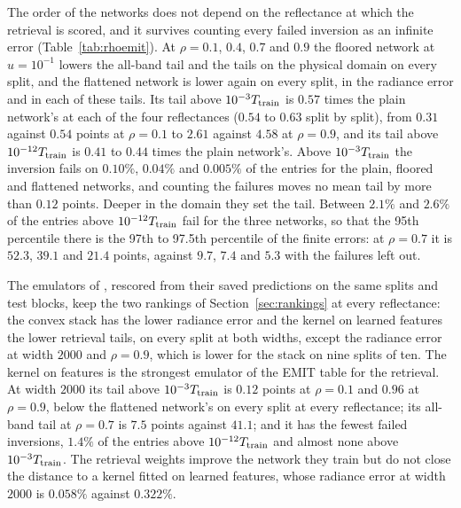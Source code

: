 \documentclass[11pt]{article}
\theoremstyle{remark}
\newcommand{\1}{\mathbf{1}}
\begin{document}
The order of the networks does not depend on the reflectance at which the retrieval is scored, and it survives
counting every failed inversion as an infinite error (Table~\ref{tab:rhoemit}). At $\rho=0.1$, $0.4$, $0.7$ and $0.9$
the floored network at $u=10^{-1}$ lowers the all-band tail and the tails on the physical domain on every split, and
the flattened network is lower again on every split, in the radiance error and in each of these tails. Its tail above
$10^{-3}T_{\rm train}$ is $0.57$ times the plain network's at each of the four reflectances ($0.54$ to $0.63$ split by
split), from $0.31$ against $0.54$ points at $\rho=0.1$ to $2.61$ against $4.58$ at $\rho=0.9$, and its tail above
$10^{-12}T_{\rm train}$ is $0.41$ to $0.44$ times the plain network's. Above $10^{-3}T_{\rm train}$ the inversion fails
on $0.10\%$, $0.04\%$ and $0.005\%$ of the entries for the plain, floored and flattened networks, and counting the
failures moves no mean tail by more than $0.12$ points. Deeper in the domain they set the tail. Between $2.1\%$ and
$2.6\%$ of the entries above $10^{-12}T_{\rm train}$ fail for the three networks, so that the 95th percentile there is
the 97th to 97.5th percentile of the finite errors: at $\rho=0.7$ it is $52.3$, $39.1$ and $21.4$ points, against
$9.7$, $7.4$ and $5.3$ with the failures left out.

The emulators of \cite{shmalo2}, rescored from their saved predictions on the same splits and test blocks, keep the two
rankings of Section~\ref{sec:rankings} at every reflectance: the convex stack has the lower radiance error and the
kernel on learned features the lower retrieval tails, on every split at both widths, except the radiance error at
width $2000$ and $\rho=0.9$, which is lower for the stack on nine splits of ten. The kernel on features is the strongest
emulator of the EMIT table for the retrieval. At width $2000$ its tail above $10^{-3}T_{\rm train}$ is $0.12$ points at
$\rho=0.1$ and $0.96$ at $\rho=0.9$, below the flattened network's on every split at every reflectance; its all-band
tail at $\rho=0.7$ is $7.5$ points against $41.1$; and it has the fewest failed inversions, $1.4\%$ of the entries above
$10^{-12}T_{\rm train}$ and almost none above $10^{-3}T_{\rm train}$. The retrieval weights improve the network they
train but do not close the distance to a kernel fitted on learned features, whose radiance error at width $2000$ is
$0.058\%$ against $0.322\%$.
\end{document}
